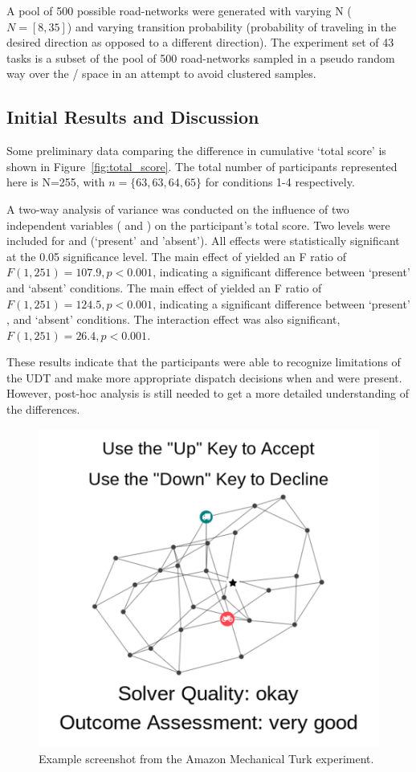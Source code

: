 A pool of 500 possible road-networks were generated with varying N ($N=[8,35]$) and varying transition probability (probability of traveling in the desired direction as opposed to a different direction). The experiment set of 43 tasks is a subset of the pool of 500 road-networks sampled in a pseudo random way over the \xQ{}/\xO{} space in an attempt to avoid clustered samples.

\subsection{Initial Results and Discussion}
Some preliminary data comparing the difference in cumulative `total score' is shown in Figure~\ref{fig:total_score}. The total number of participants represented here is N=255, with $n=\{63,63,64,65\}$ for conditions 1-4 respectively. 

A two-way analysis of variance was conducted on the influence of two independent variables (\xQ{} and \xO) on the participant's total score. Two levels were included for \xQ{} and \xO{} (`present' and 'absent'). All effects were statistically significant at the 0.05 significance level. The main effect of \xQ{} yielded an F ratio of $F(1,251)=107.9,p<0.001$, indicating a significant difference between \xQ{} `present'  and `absent'  conditions. The main effect of \xO{} yielded an F ratio of $F(1,251)=124.5,p<0.001$, indicating a significant difference between \xO{} `present' , and `absent'  conditions. The interaction effect was also significant, $F(1,251)=26.4,p<0.001$.

These results indicate that the participants were able to recognize limitations of the UDT and make more appropriate dispatch decisions when \xQ{} and \xO{} were present. However, post-hoc analysis is still needed to get a more detailed understanding of the differences.

\begin{figure}[tbp]
    \centering
    \includegraphics[width=0.45\linewidth]{Figures/experiment_screenshot_Compressed.png}
    \caption{Example screenshot from the Amazon Mechanical Turk experiment.} 
    \label{fig:experiment_screenshot}
\end{figure}

